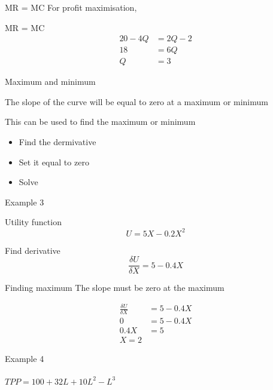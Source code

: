 \documentclass[14pt,xcolor=pdftex,dvipsnames,table, handout]{beamer}
\begin{document}
\begin{frame}{MR = MC}
For profit maximisation, 
\begin{block}{MR = MC}
\begin{align*}
20 - 4Q &= 2Q - 2\\
18 &= 6Q\\
Q &= 3
\end{align*}
\end{block}
\end{frame}

\begin{frame}{Maximum and minimum}
\begin{block}{}
The slope of the curve will be equal to zero at a maximum or minimum
\end{block}
\pause
This can be used to find the maximum or minimum
\pause
\begin{itemize}[<+-| alert@+>]
\item Find the dermivative
\item Set it equal to zero
\item Solve
\end{itemize}
\end{frame}

\begin{frame}{Example 3}
\begin{block}{Utility function}
\begin{equation*}
U = 5X - 0.2X^2
\end{equation*}
\end{block}
\begin{block}{Find derivative}
\begin{equation*}
\frac{\delta U}{\delta X} = 5 - 0.4X
\end{equation*}
\end{block}
\end{frame}

\begin{frame}{Finding maximum}
The slope must be zero at the maximum
\pause
\begin{block}{}
\begin{align*}
\frac{\delta U}{\delta X} &= 5 - 0.4X\\
0 &= 5 - 0.4X\\
0.4X &= 5\\
X = 2
\end{align*}
\end{block}
\end{frame}

\begin{frame}{Example 4}
\framesubtitle{$TPP  = 100 + 32L + 10L^2 - L^3$}
\end{frame}
\end{document}
